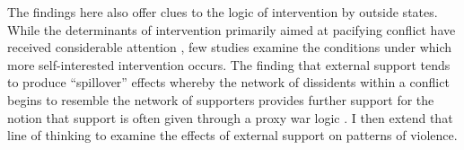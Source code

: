 The findings here also offer clues to the logic of intervention by outside states. While the determinants of intervention primarily aimed at pacifying conflict have received considerable attention \citep[e.g.][]{Regan2000a}, few studies examine the conditions under which more self-interested intervention occurs. The finding that external support tends to produce ``spillover'' effects whereby the network of dissidents within a conflict begins to resemble the network of supporters provides further support for the notion that support is often given through a proxy war logic \citep[see][]{Salehyan2010}. I then extend that line of thinking to examine the effects of external support on patterns of violence.